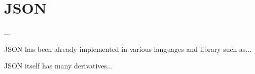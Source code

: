 \section{JSON}
\label{sec:json}

...

JSON has been already implemented in various languages and library such as...

JSON itself has many derivatives...
